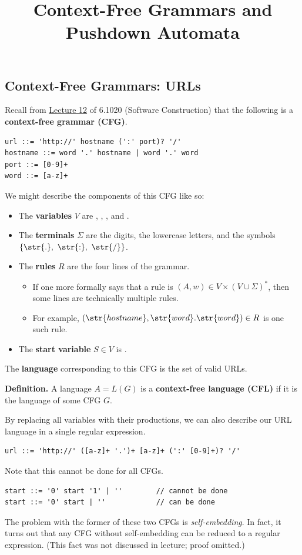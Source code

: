 \title{Context-Free Grammars and Pushdown Automata}



\subsection{Context-Free Grammars: URLs}

Recall from
\href{https://web.mit.edu/6.102/www/sp26/classes/12-grammars-parsing}{Lecture 12}
of 6.1020 (Software Construction)
that the following is a \textbf{context-free grammar (CFG)}.
\begin{verbatim}
url ::= 'http://' hostname (':' port)? '/' 
hostname ::= word '.' hostname | word '.' word
port ::= [0-9]+
word ::= [a-z]+
\end{verbatim}
We might describe the components of this CFG like so:
\begin{itemize}
    \item The \textbf{variables} $V$ are , ,
    , and .
    \item The \textbf{terminals} $\Sigma$
    are the digits, the lowercase letters,
    and the symbols $\{\str{.}, \ \str{:}, \ \str{/}\}$.
    \item The \textbf{rules} $R$ are the four lines of the grammar.
    \begin{itemize}
        \item If one more formally says that a rule is
        $(A, w) \in V \times (V \cup \Sigma)^*$, then
        some lines are technically multiple rules.
        \item For example,
        $(\str{hostname}, \str{word}.\str{word}) \in R$
        is one such rule.
    \end{itemize}
    \item The \textbf{start variable} $S \in V$ is .
\end{itemize}
The \textbf{language} corresponding to this CFG is the set of valid URLs.

\textbf{Definition.}
A language $A = L(G)$ is a \textbf{context-free language (CFL)}
if it is the language of some CFG $G$.

By replacing all variables with their productions,
we can also describe our URL language
in a single regular expression.
\begin{verbatim}
url ::= 'http://' ([a-z]+ '.')+ [a-z]+ (':' [0-9]+)? '/' 
\end{verbatim}
Note that this cannot be done for all CFGs.
\begin{verbatim}
start ::= '0' start '1' | ''        // cannot be done
start ::= '0' start | ''            // can be done
\end{verbatim}
The problem with the former of these two CFGs is \emph{self-embedding}.
In fact, it turns out that any CFG without self-embedding
can be reduced to a regular expression.
(This fact was not discussed in lecture; proof omitted.)

